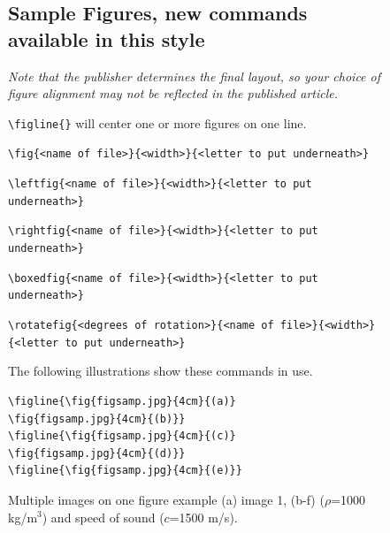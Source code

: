 \documentclass[reprint]{JASAnew}
\begin{document}
 
\begin{figure}[p]
\parskip=6pt
\baselineskip=12pt



\subsection{Sample Figures, new commands available in this style}
\vglue-14pt
{\it Note that the publisher determines the final layout, so 
your choice of figure alignment may not be reflected in the published
article.}

\noindent
\verb+\figline{}+ will center one or more figures on one line. 


\noindent
\verb+\fig{<name of file>}{<width>}{<letter to put underneath>}+

\noindent
\verb+\leftfig{<name of file>}{<width>}{<letter to put underneath>}+

\noindent
\verb+\rightfig{<name of file>}{<width>}{<letter to put underneath>}+

\noindent
\verb+\boxedfig{<name of file>}{<width>}{<letter to put underneath>}+

\noindent
\verb+\rotatefig{<degrees of rotation>}{<name of file>}{<width>}+\\
\verb+{<letter to put underneath>}+

The following illustrations show these commands in use.


\begin{verbatim}
\figline{\fig{figsamp.jpg}{4cm}{(a)}
\fig{figsamp.jpg}{4cm}{(b)}}
\figline{\fig{figsamp.jpg}{4cm}{(c)}
\fig{figsamp.jpg}{4cm}{(d)}}
\figline{\fig{figsamp.jpg}{4cm}{(e)}}
\end{verbatim}


\caption{ \label{fig:pressure_field} Multiple images on one figure example (a) image 1, (b-f) ($\rho$=1000 kg/m$^3$) and speed of sound ($c$=1500 m/s).}

\end{figure}
\end{document}
